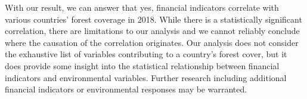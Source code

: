\documentclass[
  12pt,
]{article}
\begin{document}
With our result, we can answer that yes, financial indicators correlate
with various countries' forest coverage in 2018. While there is a
statistically significant correlation, there are limitations to our
analysis and we cannot reliably conclude where the causation of the
correlation originates. Our analysis does not consider the exhaustive
list of variables contributing to a country's forest cover, but it does
provide some insight into the statistical relationship between financial
indicators and environmental variables. Further research including
additional financial indicators or environmental responses may be
warranted.
\end{document}
